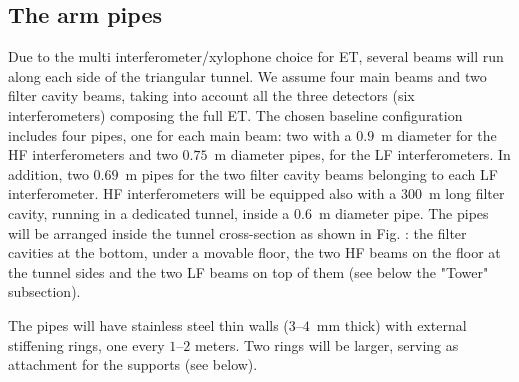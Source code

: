 \begin{comment}
The technologies that were developed and employed in the existing gravitational wave observatories have been shown to meet the stringent requirements of vacuum integrity, very low hydrogen and heavy molecule outgassing, minimal particulate generation, low vibration, and appropriate stray light optical absorbance for successful operation. However, straightforward extrapolation of the costs for extending the interferometer vacuum beam enclosures from the current lengths of 3-4~km/arm to $\sim10$~km/arm indicates the need for investigation of a range of technologies and materials that could significantly lower the final cost, facilitate construction and increase the life-cycle operation of vacuum systems for next generation observatories. 
\end{comment}

\subsection{The arm pipes} 
Due to the multi interferometer/xylophone choice for ET, several beams will run along each side of the triangular tunnel. We assume four main beams and two filter cavity beams, taking into account all the three detectors (six interferometers) composing the full ET. 
The chosen baseline configuration includes four pipes, one for each main beam: two with a $0.9$~m diameter for the HF interferometers and two $0.75$~m diameter pipes, for the LF interferometers. In addition, two $0.69$~m pipes for the two filter cavity beams belonging to each LF interferometer. HF interferometers will be equipped also with a $300$~m long filter cavity, running in a dedicated tunnel, inside a $0.6$~m diameter pipe. The pipes will be arranged inside the tunnel cross-section as shown in Fig. 
: the filter cavities at the bottom, under a movable floor, the two HF beams on the floor at the tunnel sides and the two LF beams on top of them (see below the "Tower" subsection).

The pipes will have stainless steel thin walls ($3$--$4$~mm thick) with external stiffening rings, one every $1$--$2$ meters. Two rings will be larger, serving as attachment for the supports (see below). 

